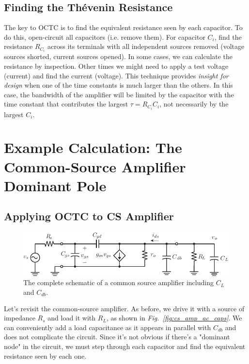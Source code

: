 \subsection{Finding the Thévenin Resistance}
The key to OCTC is to find the equivalent resistance seen by each capacitor.  To do this, open-circuit all capacitors (i.e. remove them).  For capacitor $C_i$, find the resistance $R_{C_i}$ across its terminals with all independent sources removed (voltage sources shorted, current sources opened).  In some cases, we can calculate the resistance by inspection. Other times we might need to apply a test voltage (current) and find the current (voltage).  This technique provides \textit{insight for design} when one of the time constants is much larger than the others.  In this case, the bandwidth of the amplifier will be limited by the capacitor with the time constant that contributes the largest $\tau = R_{C_i} C_i$, not necessarily by the largest $C_i$.
\section{Example Calculation:  The Common-Source Amplifier Dominant Pole}
\subsection{Applying OCTC to CS Amplifier}
\begin{figure}[tb]
\centering
\includegraphics[scale=1]{cs_amp_ac_caps}
\caption{The complete schematic of a common source amplifier including $C_L$ and $C_{db}$.} \label{fig:cs_amp_ac_caps2}
\end{figure}
Let's revisit the common-source amplifier.  As before, we drive it with a source of impedance $R_s$ and load it with $R_L$, as shown in \emph{Fig.~\ref{fig:cs_amp_ac_caps}}.  We can conveniently add a load capacitance as it appears in parallel with $C_{db}$ and does not complicate the circuit. Since it's not obvious if there's a "dominant node" in the circuit, we must step through each capacitor and find the equivalent resistance seen by each one. 

